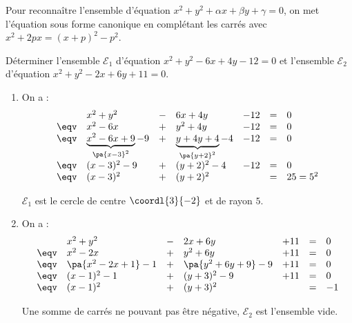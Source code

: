 \begin{methode}
	Pour reconnaître l'ensemble d'équation $x^2 + y^2 + \alpha x + \beta y + \gamma = 0$, on met l'équation sous forme canonique en complétant les carrés avec $x^2 + 2px = (x + p)^2 - p^2$.

	Déterminer l'ensemble $\mathcal{E}_1$ d'équation $x^2 + y^2 - 6x + 4y - 12 = 0$ et l'ensemble $\mathcal{E}_2$ d'équation $x^2 + y^2 - 2x + 6y + 11 = 0$.

	\begin{correction}
		\nline
		\begin{enumerate}
			\item On a :
			      \[
				      \begin{array}{rllllll}
					           & x^2 + y^2                                  & - & 6x + 4y                                 & - 12 & = & 0        \\
					      \eqv & x^2 - 6x                                   & + & y^2 + 4y                                & - 12 & = & 0        \\
					      \eqv & \underbrace{x^2 - 6x + 9}_{\pa{x-3}^2} - 9 & + & \underbrace{y + 4y +4}_{\pa{y+2}^2} - 4 & - 12 & = & 0        \\
					      \eqv & (x - 3)^2 - 9                              & + & (y + 2)^2 - 4                           & - 12 & = & 0        \\
					      \eqv & (x - 3)^2                                  & + & (y + 2)^2                               &      & = & 25 = 5^2
				      \end{array}
			      \]

			      $\mathcal{E}_1$ est le cercle de centre $\coordl{3}{-2}$ et de rayon $5$.
			\item On a :
			      \[
				      \begin{array}{rllllll}
					           & x^2 + y^2             & - & 2x + 6y                & + 11 & = & 0  \\
					      \eqv & x^2 - 2x              & + & y^2 + 6y               & + 11 & = & 0  \\
					      \eqv & \pa{x^2 - 2x + 1} - 1 & + & \pa{y^2 + 6y  + 9} - 9 & + 11 & = & 0  \\
					      \eqv & (x - 1)^2 - 1         & + & (y + 3)^2 - 9          & + 11 & = & 0  \\
					      \eqv & (x - 1)^2             & + & (y + 3)^2              &      & = & -1
				      \end{array}
			      \]

			      Une somme de carrés ne pouvant pas être négative, $\mathcal{E}_2$ est l'ensemble vide.
		\end{enumerate}
	\end{correction}
\end{methode}

